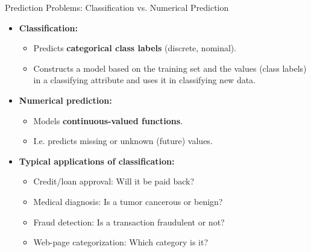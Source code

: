 \begin{frame}{Prediction Problems: Classification vs. Numerical Prediction}
	\begin{itemize}
		\item \textbf{Classification:}
		      \begin{itemize}
			      \item Predicts \textbf{\color{airforceblue}categorical class labels} (discrete, nominal).
			      \item Constructs a model based on the training set and the values (class labels) in a classifying attribute and uses it in classifying new data.
		      \end{itemize}
		\item \textbf{Numerical prediction:}
		      \begin{itemize}
			      \item Models \textbf{\color{airforceblue}continuous-valued functions}.
			      \item I.e. predicts missing or unknown (future) values.
		      \end{itemize}
		\item \textbf{Typical applications of classification:}
		      \begin{itemize}
			      \item Credit/loan approval: Will it be paid back?
			      \item Medical diagnosis: Is a tumor cancerous or benign?
			      \item Fraud detection: Is a transaction fraudulent or not?
			      \item Web-page categorization: Which category is it?
		      \end{itemize}
	\end{itemize}
\end{frame}

